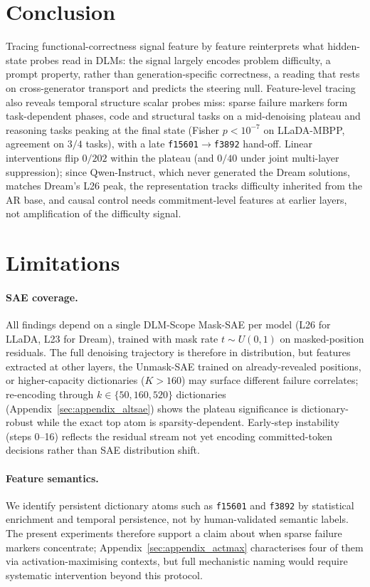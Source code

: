 \documentclass[11pt]{article}
\begin{document}
\section{Conclusion}

Tracing functional-correctness signal feature by feature reinterprets what hidden-state probes read in DLMs: the signal largely encodes problem difficulty, a prompt property, rather than generation-specific correctness, a reading that rests on cross-generator transport and predicts the steering null.
Feature-level tracing also reveals temporal structure scalar probes miss: sparse failure markers form task-dependent phases, code and structural tasks on a mid-denoising plateau and reasoning tasks peaking at the final state (Fisher $p\!<\!10^{-7}$ on LLaDA-MBPP, agreement on $3/4$ tasks), with a late \texttt{f15601}$\!\to\!$\texttt{f3892} hand-off.
Linear interventions flip $0/202$ within the plateau (and $0/40$ under joint multi-layer suppression); since Qwen-Instruct, which never generated the Dream solutions, matches Dream's L26 peak, the representation tracks difficulty inherited from the AR base, and causal control needs commitment-level features at earlier layers, not amplification of the difficulty signal.

\section*{Limitations}

\paragraph{SAE coverage.}
All findings depend on a single DLM-Scope Mask-SAE per model (L26 for LLaDA, L23 for Dream), trained with mask rate $t\!\sim\!U(0,1)$ on masked-position residuals.
The full denoising trajectory is therefore in distribution, but features extracted at other layers, the Unmask-SAE trained on already-revealed positions, or higher-capacity dictionaries ($K{>}160$) may surface different failure correlates; re-encoding through $k\!\in\!\{50,160,520\}$ dictionaries (Appendix~\ref{sec:appendix_altsae}) shows the plateau significance is dictionary-robust while the exact top atom is sparsity-dependent.
Early-step instability (steps 0--16) reflects the residual stream not yet encoding committed-token decisions rather than SAE distribution shift.

\paragraph{Feature semantics.}
We identify persistent dictionary atoms such as \texttt{f15601} and \texttt{f3892} by statistical enrichment and temporal persistence, not by human-validated semantic labels.
The present experiments therefore support a claim about when sparse failure markers concentrate; Appendix~\ref{sec:appendix_actmax} characterises four of them via activation-maximising contexts, but full mechanistic naming would require systematic intervention beyond this protocol.
\end{document}
